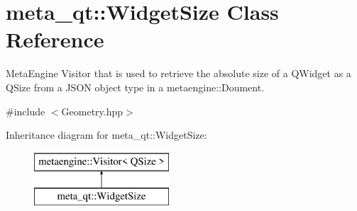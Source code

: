 \hypertarget{classmeta__qt_1_1_widget_size}{}\section{meta\+\_\+qt\+:\+:Widget\+Size Class Reference}
\label{classmeta__qt_1_1_widget_size}


Meta\+Engine Visitor that is used to retrieve the absolute size of a Q\+Widget as a Q\+Size from a J\+S\+O\+N object type in a metaengine\+::\+Doument.  




{\ttfamily \#include $<$Geometry.\+hpp$>$}

Inheritance diagram for meta\+\_\+qt\+:\+:Widget\+Size\+:\begin{figure}[H]
\begin{center}
\leavevmode
\includegraphics[height=2.000000cm]{classmeta__qt_1_1_widget_size}
\end{center}
\end{figure}
